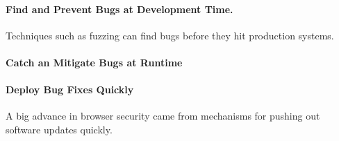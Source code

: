 \paragraph{Find and Prevent Bugs at Development Time.}
Techniques such as fuzzing can find bugs before they hit
production systems.

\paragraph{Catch an Mitigate Bugs at Runtime}

\paragraph{Deploy Bug Fixes Quickly}
A big advance in browser security came from mechanisms
for pushing out software updates quickly. 
